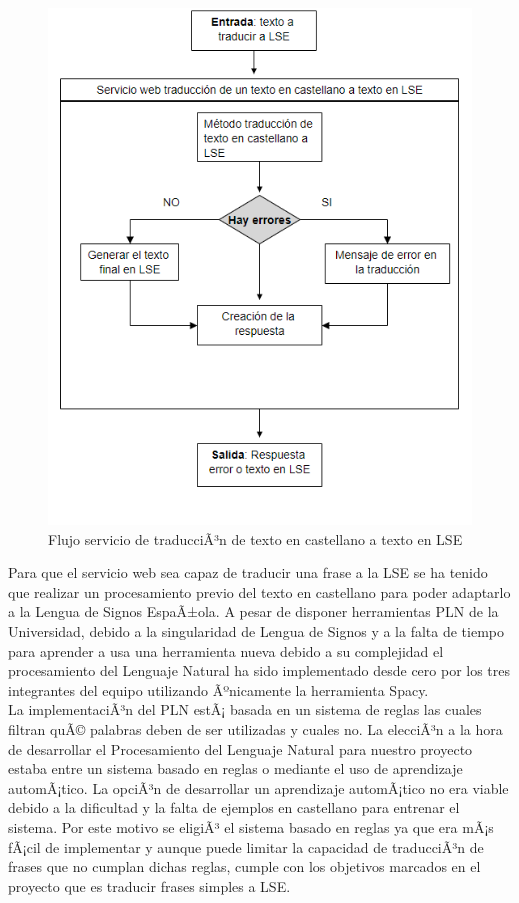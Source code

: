 \begin{figure}[]
	\centering
	\includegraphics[width=1\textwidth]{Imagenes/Fuentes/Text2LSE/FlujoTextoLSE.png}
	\caption{ Flujo servicio de traducciÃ³n de texto en castellano a texto en LSE }
	\label {fig: imgFlujoFlujoTextoLSE}
\end{figure}

Para que el servicio web sea capaz de traducir una frase a la LSE se ha tenido que realizar un procesamiento previo del texto en castellano para poder adaptarlo a la Lengua de Signos EspaÃ±ola. A pesar de disponer herramientas PLN de la Universidad, debido a la singularidad de Lengua de Signos y a la falta de tiempo para aprender a usa una herramienta nueva debido a su complejidad el procesamiento del Lenguaje Natural ha sido implementado desde cero por los tres integrantes del equipo utilizando Ãºnicamente la herramienta Spacy. \\


La implementaciÃ³n del PLN estÃ¡ basada en un sistema de reglas las cuales filtran quÃ© palabras deben de ser utilizadas y cuales no. La elecciÃ³n a la hora de desarrollar el Procesamiento del Lenguaje Natural para nuestro proyecto estaba entre un sistema basado en reglas o mediante el uso de aprendizaje automÃ¡tico. La opciÃ³n de desarrollar un aprendizaje automÃ¡tico no era viable debido a la dificultad y la falta de ejemplos en castellano para entrenar el sistema. Por este motivo se eligiÃ³ el sistema basado en reglas ya que era mÃ¡s fÃ¡cil de implementar y aunque puede limitar la capacidad de traducciÃ³n de frases que no cumplan dichas reglas, cumple con los objetivos marcados en el proyecto que es traducir frases simples a LSE.\\


